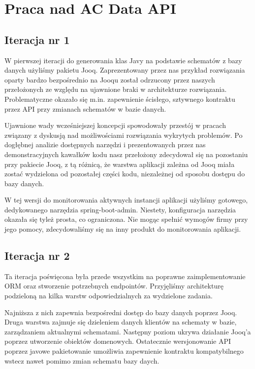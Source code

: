 \documentclass[licencjacka]{pracamgr}
\begin{document}
\chapter{Praca nad AC Data API}

\section{Iteracja nr 1}

W pierwszej iteracji do generowania klas Javy na podstawie schematów z bazy danych użyliśmy pakietu Jooq. Zaprezentowany przez nas przykład rozwiązania oparty bardzo bezpośrednio na Jooqu został odrzucony przez naszych przełożonych ze względu na ujawnione braki w architekturze rozwiązania. Problematyczne okazało się m.in. zapewnienie ścisłego, sztywnego kontraktu przez API przy zmianach schematów w bazie danych.

\vspace{1mm}

Ujawnione wady wcześniejszej koncepcji spowodowały przestój w pracach związany z dyskusją nad możliwościami rozwiązania wykrytych problemów. Po dogłębnej analizie dostępnych narzędzi i prezentowanych przez nas demonstracyjnych kawałków kodu nasz przełożony zdecydował się na pozostaniu przy pakiecie Jooq, z tą różnicą, że warstwa aplikacji zależna od Jooq miała zostać wydzielona od pozostałej części kodu, niezależnej od sposobu dostępu do bazy danych.

\vspace{1mm}

W tej wersji do monitorowania aktywnych instancji aplikacji użyliśmy gotowego, dedykowanego narzędzia spring-boot-admin. Niestety, konfiguracja narzędzia okazała się tyleż prosta, co ograniczona. Nie mogąc spełnić wymogów firmy przy jego pomocy, zdecydowaliśmy się na inny produkt do monitorowania aplikacji.
	
\section{Iteracja nr 2}

Ta iteracja poświęcona była przede wszystkim na poprawne zaimplementowanie ORM oraz stworzenie potrzebnych endpointów. Przyjęliśmy architekturę podzieloną na kilka warstw odpowiedzialnych za wydzielone zadania. 

\vspace{1mm}

Najniższa z nich zapewnia bezpośredni dostęp do bazy danych poprzez Jooq. Druga warstwa zajmuje się dzieleniem danych klientów na schematy w bazie, zarządzaniem aktualnymi schematami. Następny poziom ukrywa działanie Jooq’a poprzez utworzenie obiektów domenowych. Ostatecznie wersjonowanie API poprzez javowe pakietowanie umożliwia zapewnienie kontraktu kompatybilnego wstecz nawet pomimo zmian schematu bazy daych.
\end{document}
